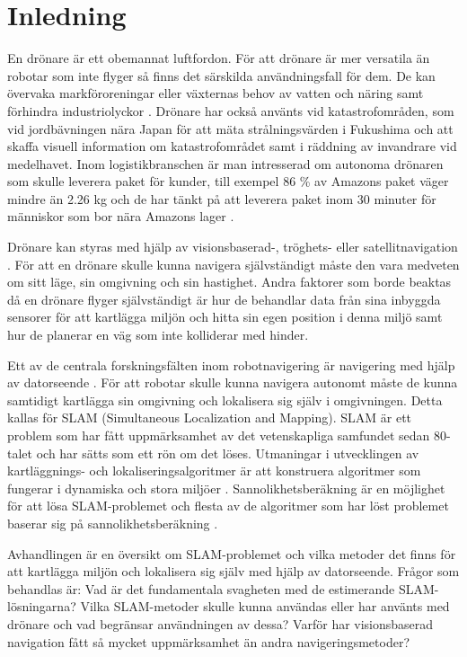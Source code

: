 \chapter{Inledning}

En drönare är ett obemannat luftfordon. För att drönare är mer versatila än robotar som inte flyger så finns det särskilda användningsfall för dem. De kan övervaka markföroreningar eller växternas behov av vatten och näring samt förhindra industriolyckor \citep{crowdsurveillance}. Drönare har också använts vid katastrofområden, som vid jordbävningen nära Japan för att mäta strålningsvärden i Fukushima och att skaffa visuell information om katastrofområdet samt i räddning av invandrare vid medelhavet. Inom logistikbranschen är man intresserad om autonoma drönaren som skulle leverera paket för kunder, till exempel 86 \% av Amazons paket väger mindre än 2.26 kg och de har tänkt på att leverera paket inom 30 minuter för människor som bor nära Amazons lager \citep{cbsnews}.

Drönare kan styras med hjälp av visionsbaserad-, tröghets- eller satellitnavigation \citep{geospatial}. För att en drönare skulle kunna navigera självständigt måste den vara medveten om sitt läge, sin omgivning och sin hastighet. Andra faktorer som borde beaktas då en drönare flyger självständigt är hur de behandlar data från sina inbyggda sensorer för att kartlägga miljön och hitta sin egen position i denna miljö samt hur de planerar en väg som inte kolliderar med hinder.

Ett av de centrala forskningsfälten inom robotnavigering är navigering med hjälp av datorseende \citep{982903}. För att robotar skulle kunna navigera autonomt måste de kunna samtidigt kartlägga sin omgivning och lokalisera sig själv i omgivningen. Detta kallas för SLAM (Simultaneous Localization and Mapping). SLAM är ett problem som har fått uppmärksamhet av det vetenskapliga samfundet sedan 80-talet och har sätts som ett rön om det löses. Utmaningar i utvecklingen av kartläggnings- och lokaliseringsalgoritmer är att konstruera algoritmer som fungerar i dynamiska och stora miljöer \citep{realslamproblem}. Sannolikhetsberäkning är en möjlighet för att lösa SLAM-problemet och flesta av de algoritmer som har löst problemet baserar sig på sannolikhetsberäkning \citep{ProbabilisticRobotics}.

Avhandlingen är en översikt om SLAM-problemet och vilka metoder det finns för att kartlägga miljön och lokalisera sig själv med hjälp av datorseende. Frågor som behandlas är: Vad är det fundamentala svagheten med de estimerande SLAM-lösningarna? Vilka SLAM-metoder skulle kunna användas eller har använts med drönare och vad begränsar användningen av dessa? Varför har visionsbaserad navigation fått så mycket uppmärksamhet än andra navigeringsmetoder?

